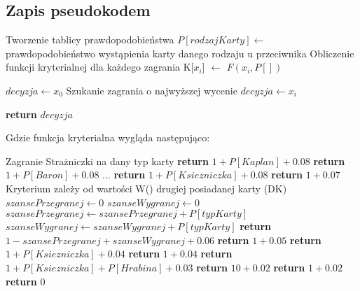 \subsection{Zapis pseudokodem}
\begin{algorithmic}[1]
		 \Comment Tworzenie tablicy prawdopodobieństwa
			\State $P[rodzajKarty] \gets$  prawdopodobieństwo wystąpienia karty danego rodzaju u przeciwnika	
		\EndFor
		 \Comment Obliczenie funkcji kryterialnej dla każdego zagrania
				\State K[$x_i$] $\gets$ $F(x_i, P[])$
		\EndFor
		
		\State $ decyzja \gets x_0$ \Comment Szukanie zagrania o najwyższej wycenie
				\State $decyzja \gets x_i$
			\EndIf
		\EndFor

		\State \textbf{return} $decyzja$
	\EndFunction
\end{algorithmic}

Gdzie funkcja kryterialna wygląda następująco:
\begin{algorithmic}[1]
			 \Comment Zagranie Strażniczki na dany typ karty
				\State \textbf{return} $ 1 + P[Kaplan] + 0.08 $
			\EndCase
				\State \textbf{return} $ 1 + P[Baron]  + 0.08 $
			\EndCase
			\State ...
				\State \textbf{return} $ 1 + P[Ksiezniczka]  + 0.08 $
			\EndCase
				\State \textbf{return} $ 1 + 0.07 $
			\EndCase
				\Comment Kryterium zależy od wartości W() drugiej posiadanej karty (DK)
				\State $ szansePrzegranej \gets 0$ 
				\State $ szanseWygranej \gets 0$ 
						\State $szansePrzegranej \gets szansePrzegranej + P[typKarty]$ 
					\State $szanseWygranej \gets szanseWygranej + P[typKarty]$ 
					\EndIf
				\EndFor
				\State \textbf{return} $ 1 - szansePrzegranej + szanseWygranej + 0.06 $
			\EndCase
				\State \textbf{return} $ 1 + 0.05 $
			\EndCase
				\State \textbf{return} $ 1 + P[Ksiezniczka] + 0.04 $
			\EndCase
				\State \textbf{return} $ 1 + 0.04 $
			\EndCase
				\State \textbf{return} $ 1 + P[Ksiezniczka] + P[Hrabina] + 0.03 $
			\EndCase
				\State \textbf{return} $ 10 + 0.02 $
			\EndCase
				\State \textbf{return} $ 1 + 0.02 $
			\EndCase
				\State \textbf{return} $ 0 $
			\EndCase
		\EndSwitch
	\EndFunction
\end{algorithmic}


